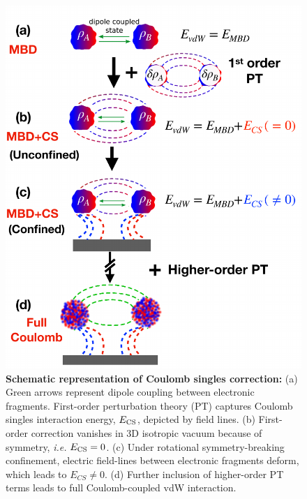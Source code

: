 \documentclass[aps,prl,groupaddress, twocolumn]{revtex4-1}  %
\begin{document}
\begin{figure}[h]
\includegraphics[scale=0.45]{Plots/Schematic_new.pdf}
\caption{\textbf{Schematic representation of Coulomb singles correction:} (a) Green arrows represent dipole coupling between electronic fragments. First-order perturbation theory (PT) captures Coulomb singles interaction energy, $E_{\rm CS}$, depicted by field lines. (b) First-order correction vanishes in 3D isotropic vacuum because of symmetry, \textit{i.e.} $E_{\rm CS} = 0$. (c) Under rotational symmetry-breaking confinement, electric field-lines between electronic fragments deform, which leads to $E_{CS} \neq 0$. (d) Further inclusion of higher-order PT terms leads to full Coulomb-coupled vdW interaction.}\label{fig:schematic}
\end{figure}
\end{document}
